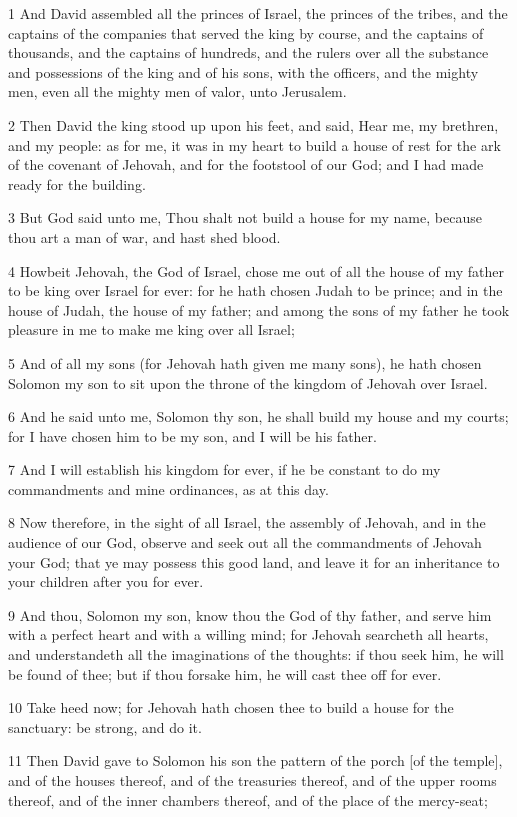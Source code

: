 \par 1 And David assembled all the princes of Israel, the princes of the tribes, and the captains of the companies that served the king by course, and the captains of thousands, and the captains of hundreds, and the rulers over all the substance and possessions of the king and of his sons, with the officers, and the mighty men, even all the mighty men of valor, unto Jerusalem.
\par 2 Then David the king stood up upon his feet, and said, Hear me, my brethren, and my people: as for me, it was in my heart to build a house of rest for the ark of the covenant of Jehovah, and for the footstool of our God; and I had made ready for the building.
\par 3 But God said unto me, Thou shalt not build a house for my name, because thou art a man of war, and hast shed blood.
\par 4 Howbeit Jehovah, the God of Israel, chose me out of all the house of my father to be king over Israel for ever: for he hath chosen Judah to be prince; and in the house of Judah, the house of my father; and among the sons of my father he took pleasure in me to make me king over all Israel;
\par 5 And of all my sons (for Jehovah hath given me many sons), he hath chosen Solomon my son to sit upon the throne of the kingdom of Jehovah over Israel.
\par 6 And he said unto me, Solomon thy son, he shall build my house and my courts; for I have chosen him to be my son, and I will be his father.
\par 7 And I will establish his kingdom for ever, if he be constant to do my commandments and mine ordinances, as at this day.
\par 8 Now therefore, in the sight of all Israel, the assembly of Jehovah, and in the audience of our God, observe and seek out all the commandments of Jehovah your God; that ye may possess this good land, and leave it for an inheritance to your children after you for ever.
\par 9 And thou, Solomon my son, know thou the God of thy father, and serve him with a perfect heart and with a willing mind; for Jehovah searcheth all hearts, and understandeth all the imaginations of the thoughts: if thou seek him, he will be found of thee; but if thou forsake him, he will cast thee off for ever.
\par 10 Take heed now; for Jehovah hath chosen thee to build a house for the sanctuary: be strong, and do it.
\par 11 Then David gave to Solomon his son the pattern of the porch [of the temple], and of the houses thereof, and of the treasuries thereof, and of the upper rooms thereof, and of the inner chambers thereof, and of the place of the mercy-seat;
